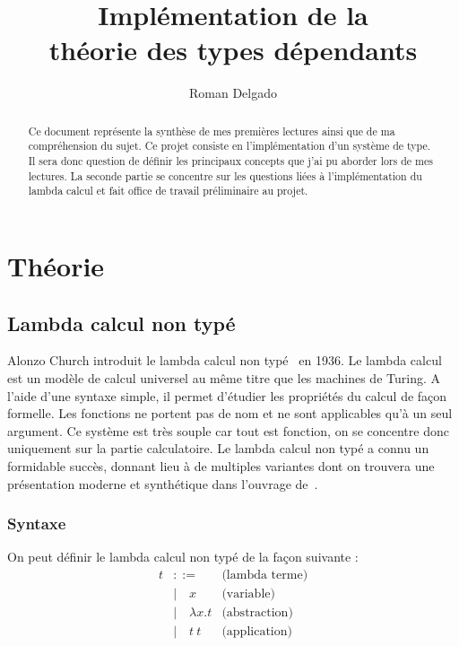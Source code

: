 \documentclass{article}
\title{Implémentation de la \\
       théorie des types dépendants}
\author{Roman Delgado}
\date{}
\theoremstyle{definition}
\theoremstyle{remark}
\begin{document}
\maketitle


\begin{abstract}
Ce document représente la synthèse de mes premières lectures ainsi que
de ma compréhension du sujet.  Ce projet consiste en l'implémentation
d'un système de type.  Il sera donc question de définir les principaux
concepts que j'ai pu aborder lors de mes lectures.  La seconde partie
se concentre sur les questions liées à l'implémentation du lambda
calcul et fait office de travail préliminaire au projet.
\end{abstract}

\tableofcontents

\clearpage


\section{Théorie}


\subsection{Lambda calcul non typé}

Alonzo Church introduit le lambda calcul non
typé~\citep{church:lambda-calcul} en 1936. Le lambda calcul est un
modèle de calcul universel au même titre que les machines de Turing.
A l'aide d'une syntaxe simple, il permet d'étudier les propriétés du
calcul de façon formelle.  Les fonctions ne portent pas de nom et ne
sont applicables qu'à un seul argument. Ce système est très souple car
tout est fonction, on se concentre donc uniquement sur la partie
calculatoire.  Le lambda calcul non typé a connu un formidable succès,
donnant lieu à de multiples variantes dont on trouvera une
présentation moderne et synthétique dans l'ouvrage
de~\citet{pierce:tapl}.

\subsubsection{Syntaxe}


On peut définir le lambda calcul non typé de la façon suivante :
%
\begin{align*}
t &::= & \mbox{(lambda terme)} \\
  &|\quad x & \mbox{(variable)} \\
  &|\quad \lambda x. t & \mbox{(abstraction)} \\
  &|\quad t\: t          & \mbox{(application)}
\end{align*}
\end{document}
